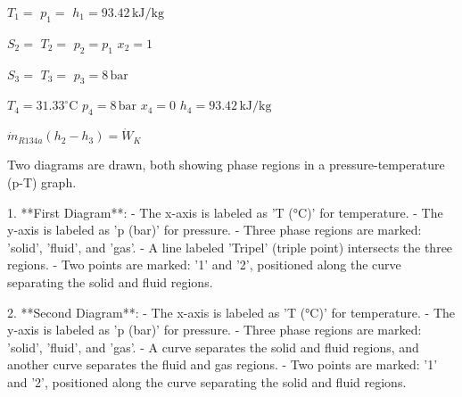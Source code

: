 \( T_1 = \)  
\( p_1 = \)  
\( h_1 = 93.42 \, \text{kJ/kg} \)  

\( S_2 = \)  
\( T_2 = \)  
\( p_2 = p_1 \)  
\( x_2 = 1 \)  

\( S_3 = \)  
\( T_3 = \)  
\( p_3 = 8 \, \text{bar} \)  

\( T_4 = 31.33^\circ \text{C} \)  
\( p_4 = 8 \, \text{bar} \)  
\( x_4 = 0 \)  
\( h_4 = 93.42 \, \text{kJ/kg} \)  

\( \dot{m}_{R134a} (h_2 - h_3) = \dot{W}_K \)

Two diagrams are drawn, both showing phase regions in a pressure-temperature (p-T) graph.

1. **First Diagram**:
   - The x-axis is labeled as 'T (°C)' for temperature.
   - The y-axis is labeled as 'p (bar)' for pressure.
   - Three phase regions are marked: 'solid', 'fluid', and 'gas'.
   - A line labeled 'Tripel' (triple point) intersects the three regions.
   - Two points are marked: '1' and '2', positioned along the curve separating the solid and fluid regions.

2. **Second Diagram**:
   - The x-axis is labeled as 'T (°C)' for temperature.
   - The y-axis is labeled as 'p (bar)' for pressure.
   - Three phase regions are marked: 'solid', 'fluid', and 'gas'.
   - A curve separates the solid and fluid regions, and another curve separates the fluid and gas regions.
   - Two points are marked: '1' and '2', positioned along the curve separating the solid and fluid regions.